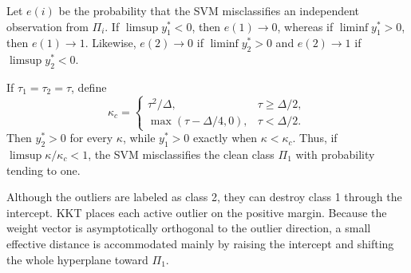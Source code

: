 \begin{corollary}\label{cor:misclass-one}
Let $e(i)$ be the probability that the SVM misclassifies an independent observation from $\Pi_i$. If $\limsup y_1^*<0$, then $e(1)\to0$, whereas if $\liminf y_1^*>0$, then $e(1)\to1$. Likewise, $e(2)\to0$ if $\liminf y_2^*>0$ and $e(2)\to1$ if $\limsup y_2^*<0$.

If $\tau_1=\tau_2=\tau$, define
\begin{equation}\label{eq:kappa-c}
\kappa_c=
\begin{cases}
\tau^2/\Delta,&\tau\ge\Delta/2,\\
\max(\tau-\Delta/4,0),&\tau<\Delta/2.
\end{cases}
\end{equation}
Then $y_2^*>0$ for every $\kappa$, while $y_1^*>0$ exactly when $\kappa<\kappa_c$. Thus, if $\limsup\kappa/\kappa_c<1$, the SVM misclassifies the clean class $\Pi_1$ with probability tending to one.
\end{corollary}

\begin{remark}
Although the outliers are labeled as class 2, they can destroy class 1 through the intercept. KKT places each active outlier on the positive margin. Because the weight vector is asymptotically orthogonal to the outlier direction, a small effective distance is accommodated mainly by raising the intercept and shifting the whole hyperplane toward $\Pi_1$.
\end{remark}
